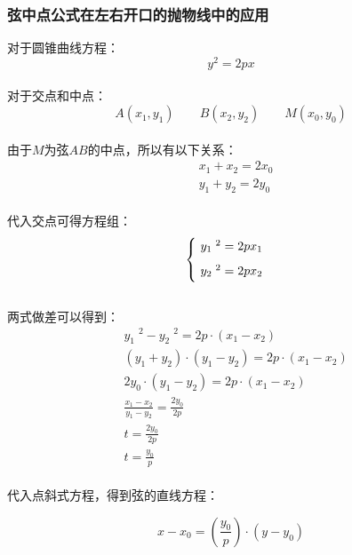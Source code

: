 \documentclass[UTF8]{ctexart}
\begin{document}
\subsubsection{弦中点公式在左右开口的抛物线中的应用}
    对于圆锥曲线方程：
    \setcounter{equation}{0}
    \begin{equation}
        y^2=2px
    \end{equation}\\
    对于交点和中点：
    \begin{equation}
        A(x_1,y_1)\qquad B(x_2,y_2)\qquad M(x_0,y_0)
    \end{equation}\\
    由于$M$为弦$AB$的中点，所以有以下关系：
    \begin{align}
        &x_1+x_2=2x_0\\[2mm]
        &y_1+y_2=2y_0
    \end{align}\\
    代入交点可得方程组：
    \begin{equation}
        \begin{cases}
            \ y_1\;^2=2px_1\\[2mm]
            \ y_2\;^2=2px_2\vspace{2pt}
        \end{cases}
    \end{equation}\\[1mm]
    两式做差可以得到：
    \begin{align}
        &y_1\;^2-y_2\;^2=2p\cdot(x_1-x_2)\\[3mm]
        &(y_1+y_2)\cdot(y_1-y_2)=2p\cdot(x_1-x_2)\\[3mm]
        &2y_0\cdot(y_1-y_2)=2p\cdot(x_1-x_2)\\[3mm]
        &\frac{x_1-x_2}{y_1-y_2}=\frac{2y_0}{2p}\\[3mm]
        &t=\frac{2y_0}{2p}\\[3mm]
        &t=\frac{y_0}{p}
    \end{align}\\
    代入点斜式方程，得到弦的直线方程：
    \begin{large}
        \begin{equation*}
            x-x_0=\left(\frac{y_0}{p}\right)\cdot(y-y_0)
        \end{equation*}
    \end{large}

\newpage
\end{document}
